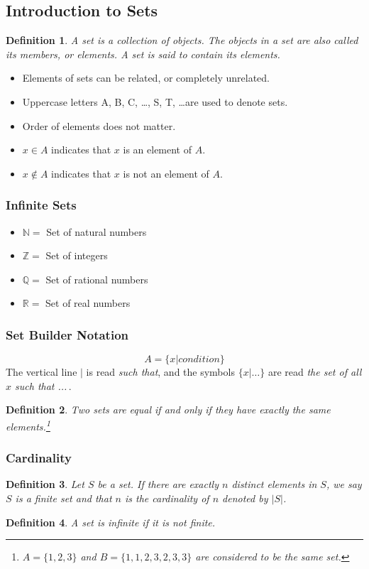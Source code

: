\documentclass[12pt]{article}
\newtheorem{definition}{Definition} [section]
\begin{document}
\subsection{Introduction to Sets}
\begin{definition}\emph{A set is a collection of objects. The objects in a set are also called its }members, \emph{or }elements. \emph{A set is said to contain its elements.}
\end{definition}
\begin{itemize}
\item Elements of sets can be related, or completely unrelated.
\item Uppercase letters A, B, C, \dots, S, T, \dots are used to denote sets.
\item Order of elements does not matter.
\item $x \in A$ indicates that $x$ is an element of $A$.
\item $x \notin A$ indicates that $x$ is not an element of $A$.
\end{itemize}
\subsubsection{Infinite Sets}
\begin{itemize}
\item $\mathbb{N} = $ Set of natural numbers%
\item $\mathbb{Z} = $ Set of integers
\item $\mathbb{Q} = $ Set of rational numbers
\item $\mathbb{R} = $ Set of real numbers
\end{itemize}
\subsubsection{Set Builder Notation}
\[A = \{x|condition\}\]
The vertical line $|$ is read \emph{such that}, and the symbols $\{x| \dots \}$ are read \emph{the set of all $x$ such that ...\,}.
\begin{definition} \emph{Two sets are equal if and only if they have exactly the same elements.\footnote{$A = \{1,2,3\}$ and $B = \{1,1,2,3,2,3,3\}$ are considered to be the same set.}} \end{definition}
\subsubsection{Cardinality}
\begin{definition} \emph{Let $S$ be a set. If there are exactly $n$ distinct elements in $S$, we say $S$ is a finite set and that $n$ is the cardinality of $n$ denoted by $|S|$.} \end{definition}
\begin{definition} \emph{A set is infinite if it is not finite.} \end{definition}
\end{document}
